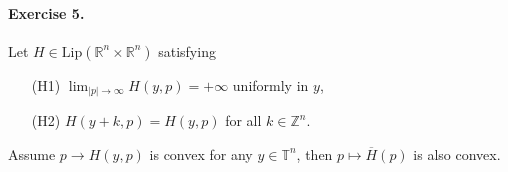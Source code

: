 \documentclass[12pt, oneside]{amsart}  	%
\begin{document}
\vspace*{0.2cm}




\paragraph{\textbf{Exercise 5}.} Let $H\in \text{Lip}(\mathbb{R}^n\times \mathbb{R}^n)$ satisfying\vspace*{0.15cm}
\begin{itemize}
\item[(H1)] $\displaystyle \lim_{|p|\longrightarrow\infty} H(y,p) = +\infty$ uniformly in $y$,\vspace*{0.15cm}
\item[(H2)] $H(y+k,p) = H(y,p)$ for all $k\in \mathbb{Z}^n$\vspace*{0.15cm}.
\end{itemize}
Assume $p\longrightarrow H(y,p)$ is convex for any $y\in \mathbb{T}^n$, then $p\longmapsto\overline{H}(p)$ is also convex.

\vspace*{0.2cm}
\end{document}
